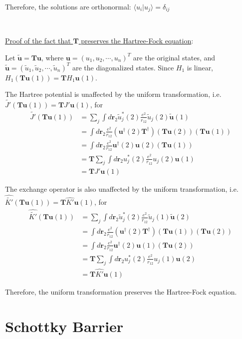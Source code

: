 \documentclass{article}
\begin{document}
Therefore, the solutions are orthonormal: $\langle u_i|u_j\rangle=\delta_{ij}$

~

\noindent\underline{Proof of the fact that $\mathbf{T}$ preserves the Hartree-Fock equation}:

Let $\tilde{\mathbf{u}}=\mathbf{T}\mathbf{u}$, where $\mathbf{u}=(u_1,u_2,\cdots,u_n)^T$ are the original states, and $\tilde{\mathbf{u}}=(\tilde{u}_1,\tilde{u}_2,\cdots,\tilde{u}_n)^T$ are the diagonalized states. Since $H_1$ is linear, $H_1(\mathbf{T}\mathbf{u}(1))=\mathbf{T}H_1\mathbf{u}(1)$.

The Hartree potential is unaffected by the uniform transformation, i.e. $\tilde{J'}(\mathbf{T}\mathbf{u}(1))=\mathbf{T}J'\mathbf{u}(1)$, for
\begin{align*}
\tilde{J'}(\mathbf{T}\mathbf{u}(1))&=\sum_j\int d\mathbf{r}_2\tilde{u}_j^*(2)\frac{e^2}{r_{12}}\tilde{u}_j(2)\tilde{\mathbf{u}}(1)\\
&=\int d\mathbf{r}_2\frac{e^2}{r_{12}}(\mathbf{u}^\dag(2)\mathbf{T}^\dag)(\mathbf{T}\mathbf{u}(2))(\mathbf{T}\mathbf{u}(1))\\
&=\int d\mathbf{r}_2\frac{e^2}{r_{12}}\mathbf{u}^\dag(2)\mathbf{u}(2)(\mathbf{T}\mathbf{u}(1))\\
&=\mathbf{T}\sum_j\int d\mathbf{r}_2u_j^*(2)\frac{e^2}{r_{12}}u_j(2)\mathbf{u}(1)\\
&=\mathbf{T}J'\mathbf{u}(1)
\end{align*}

The exchange operator is also unaffected by the uniform transformation, i.e. $\hat{\tilde{K'}}(\mathbf{T}\mathbf{u}(1))=\mathbf{T}\hat{K'}\mathbf{u}(1)$, for
\begin{align*}
\hat{\tilde{K'}}(\mathbf{T}\mathbf{u}(1))&=\sum_j\int d\mathbf{r}_2\tilde{u}_j^*(2)\frac{e^2}{r_{12}}\tilde{u}_j(1)\tilde{\mathbf{u}}(2)\\
&=\int d\mathbf{r}_2\frac{e^2}{r_{12}}(\mathbf{u}^\dag(2)\mathbf{T}^\dag)(\mathbf{T}\mathbf{u}(1))(\mathbf{T}\mathbf{u}(2))\\
&=\int d\mathbf{r}_2\frac{e^2}{r_{12}}\mathbf{u}^\dag(2)\mathbf{u}(1)(\mathbf{T}\mathbf{u}(2))\\
&=\mathbf{T}\sum_j\int d\mathbf{r}_2u_j^*(2)\frac{e^2}{r_{12}}u_j(1)\mathbf{u}(2)\\
&=\mathbf{T}\hat{K'}\mathbf{u}(1)
\end{align*}

Therefore, the uniform transformation preserves the Hartree-Fock equation.

\section{Schottky Barrier}
\end{document}
